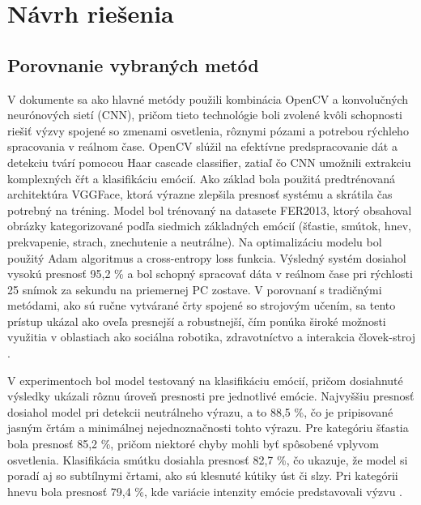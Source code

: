 \section{Návrh riešenia}        %
\subsection{Porovnanie vybraných metód}
V dokumente sa ako hlavné metódy použili kombinácia OpenCV a konvolučných neurónových sietí (CNN), pričom tieto technológie boli zvolené kvôli schopnosti riešiť výzvy 
spojené so zmenami osvetlenia, rôznymi pózami a potrebou rýchleho spracovania v reálnom čase. OpenCV slúžil na efektívne predspracovanie dát a 
detekciu tvárí pomocou Haar cascade classifier, zatiaľ čo CNN umožnili extrakciu komplexných čŕt a klasifikáciu emócií. Ako základ bola použitá predtrénovaná
architektúra VGGFace, ktorá výrazne zlepšila presnosť systému a skrátila čas potrebný na tréning. Model bol trénovaný na datasete FER2013, ktorý obsahoval obrázky
kategorizované podľa siedmich základných emócií (šťastie, smútok, hnev, prekvapenie, strach, znechutenie a neutrálne). Na optimalizáciu modelu bol použitý Adam 
algoritmus a cross-entropy loss funkcia. Výsledný systém dosiahol vysokú presnosť 95,2 \% a bol schopný spracovať dáta v reálnom čase pri rýchlosti 25 snímok
za sekundu na priemernej PC zostave. V porovnaní s tradičnými metódami, ako sú ručne vytvárané črty spojené so strojovým učením, sa tento prístup ukázal ako 
oveľa presnejší a robustnejší, čím ponúka široké možnosti využitia v oblastiach ako sociálna robotika, zdravotníctvo a interakcia človek-stroj \cite{inProceedings02}.

V experimentoch bol model testovaný na klasifikáciu emócií, pričom dosiahnuté výsledky ukázali rôznu úroveň presnosti pre jednotlivé emócie. 
Najvyššiu presnosť dosiahol model pri detekcii neutrálneho výrazu, a to 88,5 \%, čo je pripisované jasným črtám a minimálnej nejednoznačnosti tohto výrazu. 
Pre kategóriu šťastia bola presnosť 85,2 \%, pričom niektoré chyby mohli byť spôsobené vplyvom osvetlenia. Klasifikácia smútku dosiahla presnosť 82,7 \%, 
čo ukazuje, že model si poradí aj so subtílnymi črtami, ako sú klesnuté kútiky úst či slzy. Pri kategórii hnevu bola presnosť 79,4 \%, kde variácie intenzity emócie 
predstavovali výzvu \cite{inProceedings02}.

